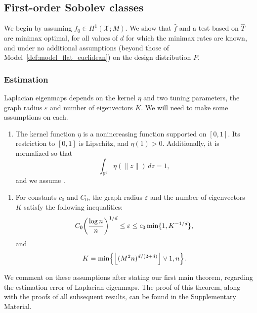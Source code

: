 \documentclass[aos]{imsart}
\theoremstyle{plain}
\theoremstyle{definition}
\theoremstyle{remark}
\def\R{\mathbb{R}}
\newcommand{\wh}[1]{\widehat{#1}}
\newcommand{\mc}[1]{\mathcal{#1}}
\newcommand{\Reals}{\mathbb{R}} %
\newcommand{\Rd}{\Reals^d}
\newcommand{\floor}[1]{\left\lfloor #1 \right\rfloor}
\newcommand{\1}{\mathbf{1}}
\begin{document}
\subsection{First-order Sobolev classes}
\label{sec:first_order_sobolev_classes}
We begin by assuming $f_0 \in H^1(\mc{X}; M)$. We show that $\wh{f}$ and a test based on $\wh{T}$ are minimax optimal, for all values of $d$ for which the minimax rates are known, and under no additional assumptions (beyond those of Model~\ref{def:model_flat_euclidean}) on the design distribution $P$.

\subsubsection{Estimation} Laplacian eigenmaps depends on the kernel $\eta$ and two tuning parameters, the graph radius $\varepsilon$ and number of eigenvectors $K$. We will need to make some assumptions on each.
\begin{enumerate}[label=(K\arabic*)]
	\setcounter{enumi}{0}
	\item
	\label{asmp:kernel_flat_euclidean}
	The kernel function $\eta$ is a nonincreasing function supported on $[0,1]$. Its restriction to $[0,1]$ is Lipschitz, and $\eta(1) > 0$. Additionally, it is normalized so that
	\begin{equation*}
	\int_{\Rd} \eta(\|z\|) \,dz = 1,
	\end{equation*}
	and we assume \smash{$\sigma_{\eta} := \frac{1}{d}\int_{\Rd} \|x\|^2 \eta(\|x\|) \,dx < \infty$}.
\end{enumerate}
\begin{enumerate}[label=(P\arabic*)]
	\setcounter{enumi}{0}
	\item 
	\label{asmp:parameters_estimation_fo} 
	For constants $c_0$ and $C_0$, the graph radius $\varepsilon$ and the number of eigenvectors $K$ satisfy the following inequalities:
	\begin{equation}\\
	\label{eqn:radius_fo} 
	C_0\biggl(\frac{\log n}{n}\biggr)^{1/d} \leq \varepsilon \leq c_0\min\{1,K^{-1/d}\},
	\end{equation}
	and 
	\begin{equation}
	\label{eqn:eigenvector_estimation_fo} 
	K = \min\Bigl\{\floor{(M^2n)^{d/(2 + d)}} \vee 1, n\Bigr\}.
	\end{equation}
\end{enumerate}
We comment on these assumptions after stating our first main theorem, regarding the estimation error of Laplacian eigenmaps. The proof of this theorem, along with the proofs of all subsequent results, can be found in the Supplementary Material.
\end{document}
